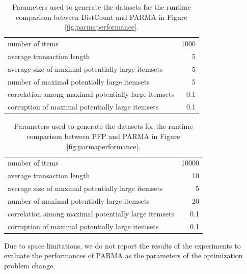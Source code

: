 \begin{table}[tb] \centering
\begin{tabular}{ l  r } \hline number of items & 1000 \\ 
average transaction length & 5 \\ 
average size of maximal potentially large itemsets & 5 \\ 
number of maximal potentially large itemsets & 5 \\
correlation among maximal potentially large itemsets & 0.1 \\
corruption of maximal potentially large itemsets & 0.1 \\ \hline
\end{tabular}
  \caption{Parameters used to generate the datasets for the runtime comparison between 
  DistCount and PARMA in Figure \ref{fig:parmaperformance}.}
  \label{tab:param1}
\end{table}

\begin{table}[tb] \centering
\begin{tabular}{ l  r } 
\hline 
number of items & 10000 \\ 
average transaction length & 10 \\ 
average size of maximal potentially large itemsets & 5 \\ 
number of maximal potentially large itemsets & 20 \\
correlation among maximal potentially large itemsets & 0.1 \\
corruption of maximal potentially large itemsets & 0.1 \\ 
\hline
\end{tabular}
  \caption{Parameters used to generate the datasets for the runtime comparison
  between PFP and PARMA in Figure \ref{fig:parmaperformance}.}
  \label{tab:param2}
\end{table}
Due to space limitations, we do not report the results of the experiments to
evaluate the performances of PARMA as the parameters of the optimization problem change.

